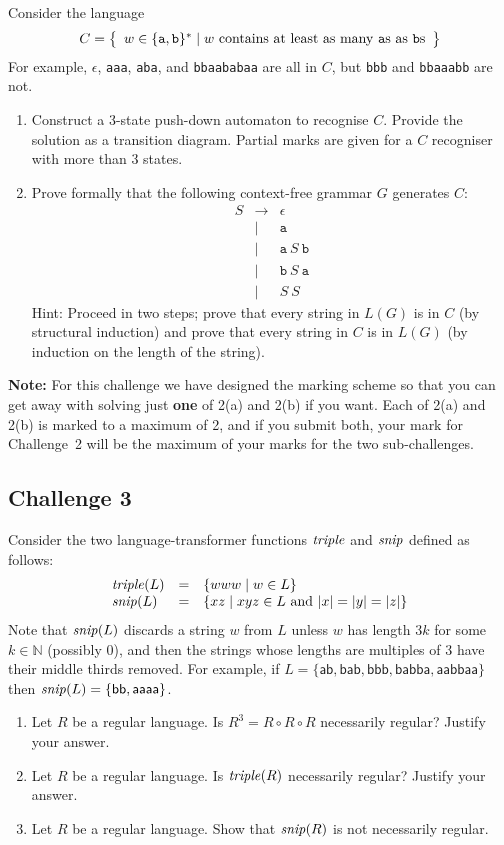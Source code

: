\documentclass[12pt]{article}
\newcommand{\id}[1]{\mbox{\textit{#1}}}
\newcommand{\ma}{\mathsf{a}}
\newcommand{\mb}{\mathsf{b}}
\newcommand{\set}[1]{\left\{
    \begin{array}{l}#1
    \end{array}
  \right\}}
\begin{document}
Consider the language
\[
  C = \set{w \in \{\texttt{a},\texttt{b}\}^* \mid
        \mbox{$w$ contains at least as many \texttt{a}s as \texttt{b}s}}
\]
For example, $\epsilon$, \verb!aaa!, \verb!aba!, and \verb!bbaababaa! 
are all in $C$,
but \verb!bbb! and \verb!bbaaabb! are not.
\begin{enumerate}
\item
Construct a 3-state push-down automaton to recognise $C$.
Provide the solution as a transition diagram.
Partial marks are given for a $C$ recogniser with more than 3 states.
\item
Prove formally that the following context-free grammar $G$ generates $C$:
\[
\begin{array}{lrl}
   S & \rightarrow
     & \epsilon 
\\   & \mid
     & \texttt{a} 
\\   & \mid
     & \texttt{a}\ S\ \texttt{b} 
\\   & \mid
     & \texttt{b}\ S\ \texttt{a} 
\\   & \mid
     & S\ S
\end{array}
\]
Hint: Proceed in two steps;
prove that every string in $L(G)$ is in $C$
(by structural induction) 
and prove that every string in $C$ is in $L(G)$
(by induction on the length of the string).
\end{enumerate}
{\bf Note:} For this challenge we have designed the marking scheme 
so that you can get away with solving just \textbf{one} of 
2(a) and 2(b) if you want.
Each of 2(a) and 2(b) is marked to a maximum of 2, 
and if you submit both, your mark for Challenge~2 will be 
the maximum of your marks for the two sub-challenges.

\pagebreak
\subsection*{Challenge 3}

Consider the two language-transformer functions $\id{triple}$ and 
$\id{snip}$ defined as follows:
\[
\begin{array}{lcl}
   \id{triple}(L) &=& \{w w w \mid w \in L\}
\\ \id{snip}(L) &=& \{ xz \mid x y z \in L \mbox{ and } |x| = |y| = |z|\}
\end{array}
\]
Note that $\id{snip}(L)$ discards a string $w$ from $L$ unless $w$
has length $3k$ for some $k \in \mathbb{N}$ (possibly 0), and then
the strings whose lengths are multiples of 3 have their middle
thirds removed.
For example, if 
$L= \{\ma\mb,\mb\ma\mb,\mb\mb\mb,\mb\ma\mb\mb\ma,\ma\ma\mb\mb\ma\ma\}$
then $\id{snip}(L) = \{\mb\mb,\ma\ma\ma\ma\}$.
\begin{enumerate}
\item
Let $R$ be a regular language.
Is $R^3 = R \circ R \circ R$ necessarily regular? 
Justify your answer.
\item
Let $R$ be a regular language.
Is $\id{triple}(R)$ necessarily regular?  
Justify your answer.
\item
Let $R$ be a regular language.
Show that $\id{snip}(R)$ is not necessarily regular.
\end{enumerate}
\end{document}
